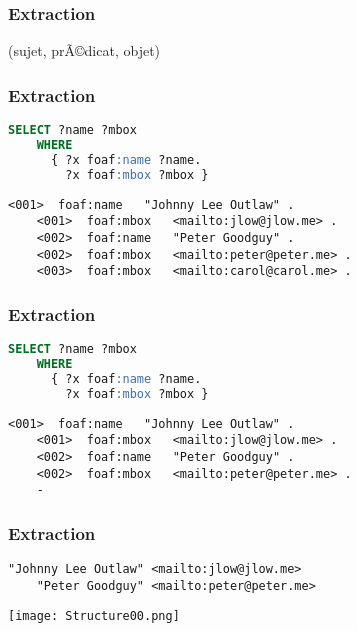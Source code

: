 \documentclass{beamer}
\begin{document}
\begin{frame}
	\frametitle{Extraction}
	\begin{block}{}
	(sujet, prÃ©dicat, objet)
	\end{block}
\end{frame}

\begin{frame}[fragile]
	\frametitle{Extraction}
	\begin{lstlisting}[language=SQL,frame=single]
	SELECT ?name ?mbox
	WHERE
	  { ?x foaf:name ?name.
	    ?x foaf:mbox ?mbox }
	\end{lstlisting}

	\begin{lstlisting}[frame=single]
	<001>  foaf:name   "Johnny Lee Outlaw" .
	<001>  foaf:mbox   <mailto:jlow@jlow.me> .
	<002>  foaf:name   "Peter Goodguy" .
	<002>  foaf:mbox   <mailto:peter@peter.me> .
	<003>  foaf:mbox   <mailto:carol@carol.me> .
	\end{lstlisting}
\end{frame}

\begin{frame}[fragile]
	\frametitle{Extraction}
	\begin{lstlisting}[language=SQL,frame=single]
	SELECT ?name ?mbox
	WHERE
	  { ?x foaf:name ?name.
	    ?x foaf:mbox ?mbox }
	\end{lstlisting}

	\begin{lstlisting}[frame=single]
	<001>  foaf:name   "Johnny Lee Outlaw" .
	<001>  foaf:mbox   <mailto:jlow@jlow.me> .
	<002>  foaf:name   "Peter Goodguy" .
	<002>  foaf:mbox   <mailto:peter@peter.me> .
	-
	\end{lstlisting}
\end{frame}

\begin{frame}[fragile]
	\frametitle{Extraction}
	\begin{lstlisting}[frame=single]
	"Johnny Lee Outlaw"	<mailto:jlow@jlow.me>
	"Peter Goodguy"	<mailto:peter@peter.me>
	\end{lstlisting}
\end{frame}

\begin{frame}[fragile]
	\texttt{[image: Structure00.png]}
\end{frame}
\end{document}
